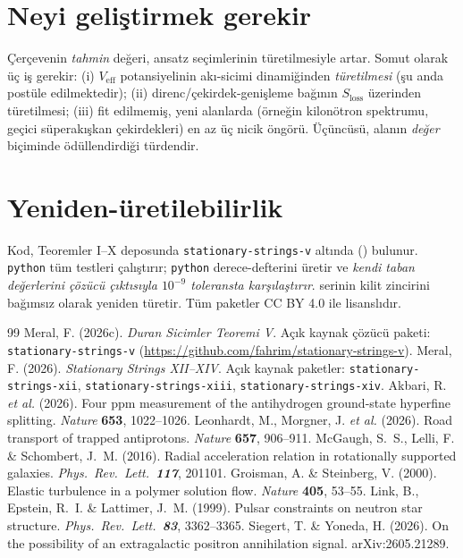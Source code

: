 \documentclass[12pt,a4paper]{article}
\begin{document}
\section{Neyi geliştirmek gerekir}
Çerçevenin \emph{tahmin} değeri, ansatz seçimlerinin türetilmesiyle artar.
Somut olarak üç iş gerekir: (i) $V_{\mathrm{eff}}$ potansiyelinin
akı-sicimi dinamiğinden \emph{türetilmesi} (şu anda postüle edilmektedir);
(ii) direnc/çekirdek-genişleme bağının $S_{\mathrm{loss}}$ üzerinden
türetilmesi; (iii) fit edilmemiş, yeni alanlarda (örneğin kilonötron
spektrumu, geçici süperakışkan çekirdekleri) en az üç nicik öngörü.
Üçüncüsü, alanın \emph{değer} biçiminde ödüllendirdiği türdendir.

\section{Yeniden-üretilebilirlik}
Kod, Teoremler I--X deposunda \texttt{stationary-strings-v} altında
() bulunur. \texttt{python}
 tüm testleri çalıştırır; \texttt{python}
 derece-defterini üretir ve \emph{kendi taban
değerlerini çözücü çıktısıyla $10^{-9}$ toleransta karşılaştırır}.
 serinin kilit zincirini bağımsız olarak
yeniden türetir. Tüm paketler CC BY 4.0 ile lisanslıdır.

\begin{thebibliography}{99}
     Meral, F. (2026c). \textit{Duran Sicimler Teoremi V}.
    Açık kaynak çözücü paketi: \texttt{stationary-strings-v}
    (\url{https://github.com/fahrim/stationary-strings-v}).
     Meral, F. (2026). \textit{Stationary Strings XII--XIV}.
    Açık kaynak paketler: \texttt{stationary-strings-xii}, \texttt{stationary-strings-xiii},
    \texttt{stationary-strings-xiv}.
     Akbari, R. \textit{et al.} (2026). Four ppm measurement of
    the antihydrogen ground-state hyperfine splitting. \textit{Nature}
    \textbf{653}, 1022--1026.
     Leonhardt, M., Morgner, J. \textit{et al.} (2026). Road
    transport of trapped antiprotons. \textit{Nature} \textbf{657}, 906--911.
     McGaugh, S.~S., Lelli, F. \& Schombert, J.~M. (2016).
    Radial acceleration relation in rotationally supported galaxies.
    \textit{Phys.\ Rev.\ Lett.\ \textbf{117}}, 201101.
     Groisman, A. \& Steinberg, V. (2000). Elastic turbulence in
    a polymer solution flow. \textit{Nature} \textbf{405}, 53--55.
     Link, B., Epstein, R.~I. \& Lattimer, J.~M. (1999).
    Pulsar constraints on neutron star structure.
    \textit{Phys.\ Rev.\ Lett.\ \textbf{83}}, 3362--3365.
     Siegert, T. \& Yoneda, H. (2026). On the possibility of an
    extragalactic positron annihilation signal. arXiv:2605.21289.
\end{thebibliography}
\end{document}

